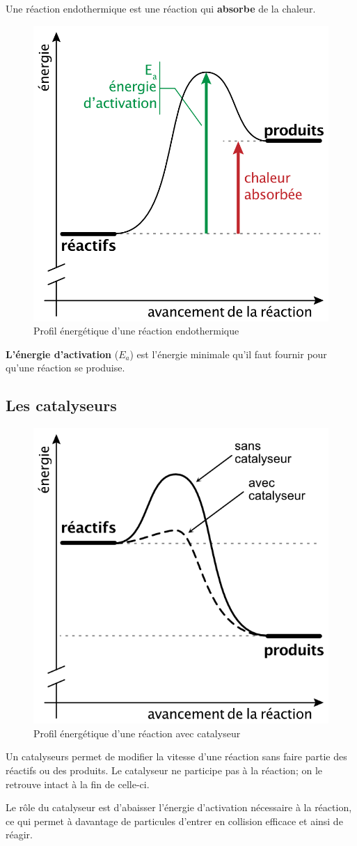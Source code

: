 \documentclass[
  11pt,
  a4paper,
  openany]{book}
\begin{document}
Une réaction endothermique est une réaction qui \textbf{absorbe} de la chaleur.

\begin{figure}

{\centering \includegraphics[width=0.33\linewidth]{images/chaleur-2} 

}

\caption{Profil énergétique d'une réaction endothermique}\label{fig:chaleur-2}
\end{figure}

\textbf{L'énergie d'activation} (\(E_a\)) est l'énergie minimale qu'il faut fournir pour qu'une réaction se produise.

\subsection{Les catalyseurs}\label{les-catalyseurs}

\begin{figure}

{\centering \includegraphics[width=0.33\linewidth]{images/catalyseur} 

}

\caption{Profil énergétique d'une réaction avec catalyseur}\label{fig:catalyseur}
\end{figure}

Un catalyseurs permet de modifier la vitesse d'une réaction sans faire partie des réactifs ou des produits. Le catalyseur ne participe pas à la réaction; on le retrouve intact à la fin de celle-ci.

Le rôle du catalyseur est d'abaisser l'énergie d'activation nécessaire à la réaction, ce qui permet à davantage de particules d'entrer en collision efficace et ainsi de réagir.
\end{document}
